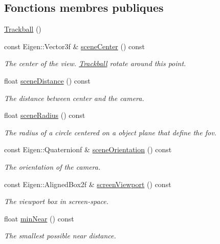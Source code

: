 \subsection*{Fonctions membres publiques}
\begin{DoxyCompactItemize}
\item 
\hyperlink{class_trackball_a11588efe7e24d7deb177f4df3dbd9916}{Trackball} ()
\item 
const Eigen\+::\+Vector3f \& \hyperlink{class_trackball_ad658224ce2f6a47a1f607852c887654b}{scene\+Center} () const
\begin{DoxyCompactList}\small\item\em The center of the view. \hyperlink{class_trackball}{Trackball} rotate around this point. \end{DoxyCompactList}\item 
float \hyperlink{class_trackball_a9b40eb48561c425f30498a8a9f10ca1f}{scene\+Distance} () const
\begin{DoxyCompactList}\small\item\em The distance between {\ttfamily center} and the camera. \end{DoxyCompactList}\item 
float \hyperlink{class_trackball_acd26e3c6e72d935e556e6b10bd2a0c1d}{scene\+Radius} () const
\begin{DoxyCompactList}\small\item\em The radius of a circle centered on a object plane that define the fov. \end{DoxyCompactList}\item 
const Eigen\+::\+Quaternionf \& \hyperlink{class_trackball_a3ee1a7c88f90ac00ffab791dd8704ef2}{scene\+Orientation} () const
\begin{DoxyCompactList}\small\item\em The orientation of the camera. \end{DoxyCompactList}\item 
const Eigen\+::\+Aligned\+Box2f \& \hyperlink{class_trackball_a42799fa68d03eab4dbcee55e3dfea55e}{screen\+Viewport} () const
\begin{DoxyCompactList}\small\item\em The viewport box in screen-\/space. \end{DoxyCompactList}\item 
float \hyperlink{class_trackball_ae10b18ba9b38e588e996e35a709bab29}{min\+Near} () const
\begin{DoxyCompactList}\small\item\em The smallest possible near distance. \end{DoxyCompactList}\item 

\end{DoxyCompactItemize}

